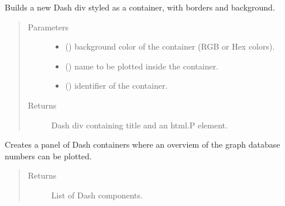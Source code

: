 \documentclass[letterpaper,10pt,english]{sphinxmanual}
\begin{document}
\begin{fulllineitems}
\label{\detokenize{_autosummary/report_manager.apps:report_manager.apps.homepageStats.indicator}}
Builds a new Dash div styled as a container, with borders and background.
\begin{quote}\begin{description}
\item[{Parameters}] \leavevmode\begin{itemize}
\item {} 
 () \textendash{} background color of the container (RGB or Hex colors).

\item {} 
 () \textendash{} name to be plotted inside the container.

\item {} 
 () \textendash{} identifier of the container.

\end{itemize}

\item[{Returns}] \leavevmode
Dash div containing title and an html.P element.

\end{description}\end{quote}

\end{fulllineitems}


\begin{fulllineitems}
\label{\detokenize{_autosummary/report_manager.apps:report_manager.apps.homepageStats.quick_numbers_panel}}
Creates a panel of Dash containers where an overviem of the graph database numbers can be plotted.
\begin{quote}\begin{description}
\item[{Returns}] \leavevmode
List of Dash components.

\end{description}\end{quote}

\end{fulllineitems}
\end{document}
